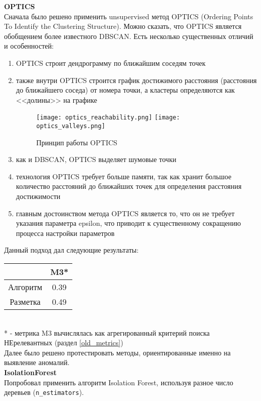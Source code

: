 \documentclass{article}
\begin{document}
\textbf{OPTICS}\\
Сначала было решено применить unsupervised метод OPTICS (Ordering Points To Identify the Clustering Structure). Можно сказать, что OPTICS является обобщением более известного DBSCAN. Есть несколько существенных отличий и особенностей:
\begin{enumerate}
    \item OPTICS строит дендрограмму по ближайшим соседям точек
    \item также внутри OPTICS строится график достижимого расстояния (расстояния до ближайшего соседа) от номера точки, а кластеры определяются как <<долины>> на графике
    \begin{figure}[!htb]
    \center
        \texttt{[image: optics\_reachability.png]}
        \texttt{[image: optics\_valleys.png]}
        \caption{Принцип работы OPTICS}
    \end{figure}
    \item как и DBSCAN, OPTICS выделяет шумовые точки
    \item технология OPTICS требует больше памяти, так как хранит большое количество расстояний до ближайших точек для определения расстояния достижимости
    \item главным достоинством метода OPTICS является то, что он не требует указания параметра epsilon, что приводит к существенному сокращению процесса настройки параметров
\end{enumerate}

Данный подход дал следующие результаты:
\begin{table}[!htb]
    \center
    \begin{tabular}{|c|c|}
    \hline
             & M3*   \\ \hline
    Алгоритм & 0.39 \\ \hline
    Разметка & 0.49 \\ \hline
    \end{tabular}
\end{table}\\
* - метрика M3 вычислялась как агрегированный критерий поиска НЕрелевантных (раздел \textcolor{cyan}{\ref{old_metrics}})\\

Далее было решено протестировать методы, ориентированные именно на выявление аномалий.\\

\textbf{IsolationForest}\label{isolationforest}\\
Попробовал применить алгоритм Isolation Forest, используя разное число деревьев (\verb|n_estimators|).\\
\end{document}
